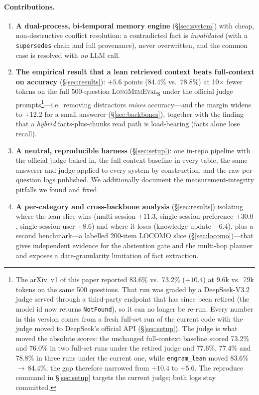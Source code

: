 \documentclass{article}
\newcommand{\lean}{\texttt{engram\_lean}}
\begin{document}
\paragraph{Contributions.}
\begin{enumerate}
  \item \textbf{A dual-process, bi-temporal memory engine} (\S\ref{sec:system}) with cheap, non-destructive
  conflict resolution: a contradicted fact is \emph{invalidated} (with a \texttt{supersedes} chain and full
  provenance), never overwritten, and the common case is resolved with \emph{no} LLM call.
  \item \textbf{The empirical result that a lean retrieved context beats full-context on accuracy}
  (\S\ref{sec:results}): $+5.6$ points (84.4\% vs.\ 78.8\%) at 10$\times$ fewer tokens on the full
  500-question \textsc{LongMemEval}\textsubscript{S} under the official judge prompts\footnote{\label{fn:judge}%
  The arXiv~v1 of this paper reported 83.6\% vs.\ 73.2\% ($+10.4$) at 9.6k vs.\ 79k tokens on the same %
  500 questions. That run was graded by a DeepSeek-V3.2 judge served through a third-party endpoint that %
  has since been retired (the model id now returns \texttt{NotFound}), so it can no longer be re-run. %
  Every number in this version comes from a fresh full-set run of the current code with the judge moved %
  to DeepSeek's official API (\S\ref{sec:setup}). The judge is what moved the absolute scores: the %
  unchanged full-context baseline scored 73.2\% and 76.0\% in two full-set runs under the retired judge %
  and 77.6\%, 77.4\% and 78.8\% in three runs under the current one, while \lean{} moved %
  83.6\%\,$\rightarrow$\,84.4\%; the gap therefore narrowed from $+10.4$ to $+5.6$. The reproduce %
  command in \S\ref{sec:setup} targets the current judge; both logs stay committed.}---i.e.\ removing %
  distractors \emph{raises} accuracy---and the margin widens to $+12.2$ for a small answerer
  (\S\ref{sec:backbones}), together with the finding that a \emph{hybrid} facts-plus-chunks read path is
  load-bearing (facts alone lose recall).
  \item \textbf{A neutral, reproducible harness} (\S\ref{sec:setup}): one in-repo pipeline with the official
  judge baked in, the full-context baseline in every table, the same answerer and judge applied to every
  system by construction, and the raw per-question logs published. We additionally document the
  measurement-integrity pitfalls we found and fixed.
  \item \textbf{A per-category and cross-backbone analysis} (\S\ref{sec:results}) isolating where the lean
  slice wins (multi-session $+11.3$, single-session-preference $+30.0$, single-session-user $+8.6$) and
  where it loses (knowledge-update $-6.4$), plus a second benchmark---a labelled 200-item LOCOMO
  slice (\S\ref{sec:locomo})---that gives independent evidence for the abstention gate and the multi-hop
  planner and exposes a date-granularity limitation of fact extraction.
\end{enumerate}
\end{document}
